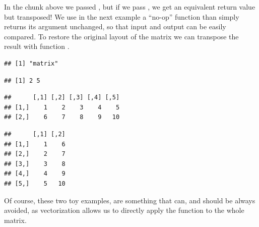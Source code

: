 \documentclass[krantz2,ChapterTOCs]{krantz}\usepackage{knitr}
\begin{document}
\begin{warningbox}
In the chunk above we passed , but if we pass , we get an equivalent return value but transposed! We use in the next example a ``no-op'' function than simply returns its argument unchanged, so that input and output can be easily compared. To restore the original layout of the matrix we can transpose the result with function .

\begin{knitrout}\footnotesize
{}\color{fgcolor}\begin{kframe}
\begin{alltt}
 \hlkwb{<-} \hlstd{(}   \hlstd{=} \hlstd{,}  
\end{alltt}
\begin{verbatim}
## [1] "matrix"
\end{verbatim}
\begin{alltt}
\end{alltt}
\begin{verbatim}
## [1] 2 5
\end{verbatim}
\begin{alltt}
\end{alltt}
\begin{verbatim}
##      [,1] [,2] [,3] [,4] [,5]
## [1,]    1    2    3    4    5
## [2,]    6    7    8    9   10
\end{verbatim}
\begin{alltt}
\end{alltt}
\begin{verbatim}
##      [,1] [,2]
## [1,]    1    6
## [2,]    2    7
## [3,]    3    8
## [4,]    4    9
## [5,]    5   10
\end{verbatim}
\end{kframe}
\end{knitrout}

Of course, these two toy examples, are something that can, and should be always avoided, as vectorization allows us to directly apply the function to the whole matrix.

\begin{knitrout}\footnotesize
{}\color{fgcolor}\begin{kframe}
\begin{alltt}
 \hlkwb{<-} 
\end{alltt}
\end{kframe}
\end{knitrout}


\end{warningbox}
\end{document}
